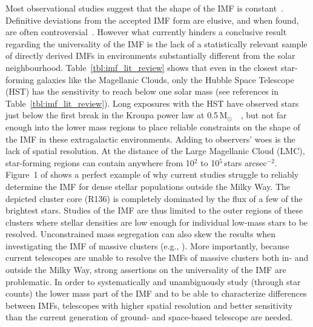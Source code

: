 \documentclass{aa}
\newcommand{\msun}{M$_\odot$~}
\newcommand{\h}[1]{$^{#1}$}
\newcommand{\spae}{stars arcsec$^{-2}$}
\begin{document}
Most observational studies suggest that the shape of the IMF is constant~\citep{Lada2003-ip,Kroupa2002,Bastian2010}.
Definitive deviations from the accepted IMF form are elusive, and when found, are often controversial~\citep{Van_Dokkum2010-gx,Conroy2012-hv,Drass2016-kp}.
However what currently hinders a conclusive result regarding the universality of the IMF is the lack of a statistically relevant sample of directly derived IMFs in environments substantially different from the solar neighbourhood.
Table~\ref{tbl:imf_lit_review} shows that even in the closest star-forming galaxies like the Magellanic Clouds, only the Hubble Space Telescope (HST) has the sensitivity to reach below one solar mass (see references in Table~\ref{tbl:imf_lit_review}).
Long exposures with the HST have observed stars just below the first break in the Kroupa power law at 0.5\,\msun~\citep{dario2009,kalirai2013,geha2013}, but not far enough into the lower mass regions to place reliable constraints on the shape of the IMF in these extragalactic environments.
Adding to observers' woes is the lack of spatial resolution.
At the distance of the Large Magellanic Cloud (LMC), star-forming regions can contain anywhere from 10\h2 to 10\h5\,\spae.
Figure~1 of \citet{sirianni2000} shows a perfect example of why current studies struggle to reliably determine the IMF for dense stellar populations outside the Milky Way.
The depicted cluster core (R136) is completely dominated by the flux of a few of the brightest stars.
Studies of the IMF are thus limited to the outer regions of these clusters where stellar densities are low enough for individual low-mass stars to be resolved.
Unconstrained mass segregation can also skew the results when investigating the IMF of massive clusters (e.g., \citealt{Ascenso2009-de}).
More importantly, because current telescopes are unable to resolve the IMFs of massive clusters both in- and outside the Milky Way, strong assertions on the universality of the IMF are problematic.
In order to systematically and unambiguously study (through star counts) the lower mass part of the IMF and to be able to characterize differences between IMFs, telescopes with higher spatial resolution and better sensitivity than the current generation of ground- and space-based telescope are needed.
\end{document}
